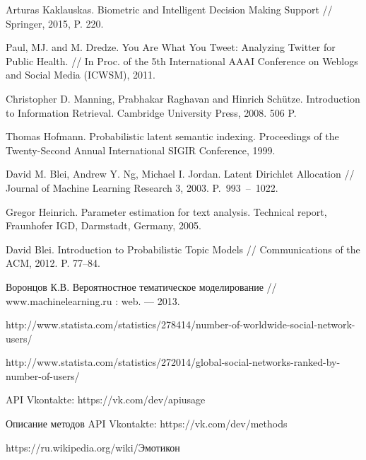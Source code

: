 \documentclass[a4paper]{report}
\begin{document}
    \begingroup
    \let\clearpage\relax
    \vskip-3cm
	\begin{thebibliography}{9}
	
		Arturas Kaklauskas. Biometric and Intelligent Decision Making Support // Springer, 2015, P. 220.
		
		Paul, MJ. and M. Dredze. You Are What You Tweet: Analyzing Twitter for Public Health. // In Proc. of the 5th International AAAI Conference on Weblogs and Social Media (ICWSM),  2011. 
		
		Christopher D. Manning, Prabhakar Raghavan and Hinrich Schütze. Introduction to Information Retrieval. Cambridge University Press, 2008. 506 P.
		
		Thomas Hofmann. Probabilistic latent semantic indexing. Proceedings of the Twenty-Second Annual International SIGIR Conference, 1999.
		
		David M. Blei, Andrew Y. Ng, Michael I. Jordan. Latent Dirichlet Allocation // Journal of Machine Learning Research 3, 2003. P.~993~--~1022.
		
		Gregor Heinrich. Parameter estimation for text analysis. Technical
report, Fraunhofer IGD, Darmstadt, Germany, 2005.

		David Blei. Introduction to Probabilistic Topic Models // Communications of the ACM, 2012. P. 77–84.

		Воронцов К.В. Вероятностное тематическое моделирование // www.machinelearning.ru : web. — 2013.

		http://www.statista.com/statistics/278414/number-of-worldwide-social-network-users/

		http://www.statista.com/statistics/272014/global-social-networks-ranked-by-number-of-users/
		
		API Vkontakte: https://vk.com/dev/apiusage
		
		Описание методов API Vkontakte: https://vk.com/dev/methods
		
		https://ru.wikipedia.org/wiki/Эмотикон
		

\end{thebibliography}
\end{document}
